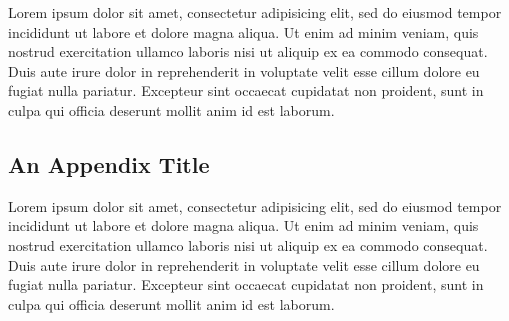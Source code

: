 \documentclass[12pt,letterpaper,oneside,final]{memoir}
\begin{document}
Lorem ipsum dolor sit amet, consectetur adipisicing elit, sed do eiusmod tempor incididunt ut labore et dolore magna aliqua. Ut enim ad minim veniam, quis nostrud exercitation ullamco laboris nisi ut aliquip ex ea commodo consequat. Duis aute irure dolor in reprehenderit in voluptate velit esse cillum dolore eu fugiat nulla pariatur. Excepteur sint occaecat cupidatat non proident, sunt in culpa qui officia deserunt mollit anim id est laborum.

\begin{appendices}

\chapter{An Appendix Title}
Lorem ipsum dolor sit amet, consectetur adipisicing elit, sed do eiusmod tempor incididunt ut labore et dolore magna aliqua. Ut enim ad minim veniam, quis nostrud exercitation ullamco laboris nisi ut aliquip ex ea commodo consequat. Duis aute irure dolor in reprehenderit in voluptate velit esse cillum dolore eu fugiat nulla pariatur. Excepteur sint occaecat cupidatat non proident, sunt in culpa qui officia deserunt mollit anim id est laborum.

\end{appendices}

\newpage

\clearpage

\backmatter

\begin{OnehalfSpace}
\setlength{\bibitemsep}{\onelineskip}
\printbibliography

\end{OnehalfSpace}
\end{document}
